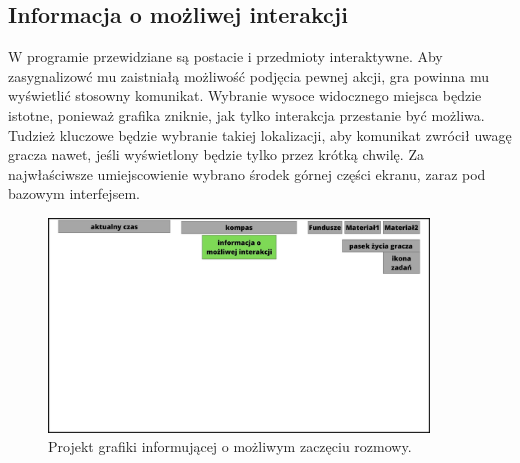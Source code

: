 \subsection{Informacja o możliwej interakcji}
W programie przewidziane są postacie i przedmioty interaktywne. Aby zasygnalizowć mu zaistniałą możliwość podjęcia pewnej akcji, 
gra powinna mu wyświetlić stosowny komunikat. Wybranie wysoce widocznego miejsca będzie istotne, ponieważ grafika zniknie,
jak tylko interakcja przestanie być możliwa. Tudzież kluczowe będzie wybranie takiej lokalizacji, aby komunikat zwrócił uwagę gracza nawet, 
jeśli wyświetlony będzie tylko przez krótką chwilę. Za najwłaściwsze umiejscowienie wybrano środek górnej części ekranu, zaraz
 pod bazowym interfejsem.
    \begin{figure}[htbp]
    \centering
    \includegraphics[width=0.9\textwidth]{images/ui/ui_prooj_interakcja.jpg}
    \caption{Projekt grafiki informującej o możliwym zaczęciu rozmowy.}\label{fig:rozmow}
\end{figure}

